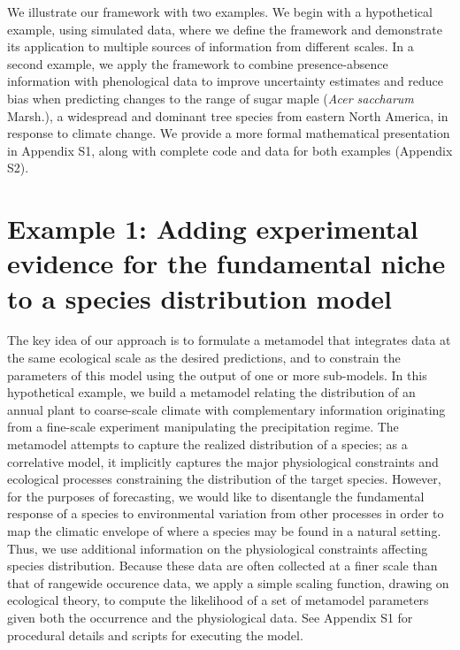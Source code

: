 \documentclass[11pt]{article}
\begin{document}
We illustrate our framework with two examples.
We begin with a hypothetical example, using simulated data, where we define the framework and demonstrate its application to multiple sources of information from different scales.
In a second example, we apply the framework to combine presence-absence information with phenological data to improve uncertainty estimates and reduce bias when predicting changes to the range of sugar maple (\emph{Acer saccharum} Marsh.), a widespread and dominant tree species from eastern North America, in response to climate change.
We provide a more formal mathematical presentation in Appendix S1, along with complete code and data for both examples (Appendix S2).

%
%
\section*{Example 1: Adding experimental evidence for the fundamental niche to a species distribution model}
The key idea of our approach is to formulate a metamodel that integrates data at the same ecological scale as the desired predictions, and to constrain the parameters of this model using the output of one or more sub-models.
In this hypothetical example, we build a metamodel relating the distribution of an annual plant to coarse-scale climate with complementary information originating from a fine-scale experiment manipulating the precipitation regime.
The metamodel attempts to capture the realized distribution of a species; as a correlative model, it implicitly captures the major physiological constraints and ecological processes constraining the distribution of the target species. 
However, for the purposes of forecasting, we would like to disentangle the fundamental response of a species to environmental variation from other processes in order to map the climatic envelope of where a species may be found in a natural setting.
Thus, we use additional information on the physiological constraints affecting species distribution.
Because these data are often collected at a finer scale than that of rangewide occurence data, we apply a simple scaling function, drawing on ecological theory, to compute the likelihood of a set of metamodel parameters given both the occurrence and the physiological data.
See Appendix S1 for procedural details and scripts for executing the model.
\end{document}
